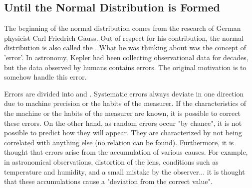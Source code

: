 \documentclass{ltjbook}
\begin{document}
\subsection{Until the Normal Distribution is Formed}
The beginning of the normal distribution comes from the research of German physicist Carl Friedrich Gauss. Out of respect for his contribution, the normal distribution is also called the .
What he was thinking about was the concept of 'error'. In astronomy, Kepler had been collecting observational data for decades, but the data observed by humans contains errors. The original motivation is to somehow handle this error.

Errors are divided into  and . Systematic errors always deviate in one direction due to machine precision or the habits of the measurer. If the characteristics of the machine or the habits of the measurer are known, it is possible to correct these errors. On the other hand, as random errors occur "by chance", it is not possible to predict how they will appear. They are characterized by not being correlated with anything else (no relation can be found).
Furthermore, it is thought that errors arise from the accumulation of various causes. For example, in astronomical observations, distortion of the lens, conditions such as temperature and humidity, and a small mistake by the observer... it is thought that these accumulations cause a "deviation from the correct value".
\end{document}
